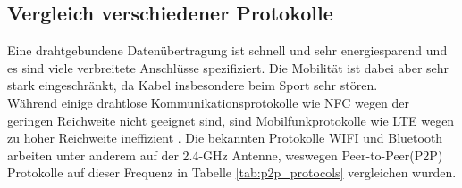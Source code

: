 \subsection{Vergleich verschiedener Protokolle}
Eine drahtgebundene Datenübertragung ist schnell und sehr energiesparend und es sind viele verbreitete Anschlüsse spezifiziert.
Die Mobilität ist dabei aber sehr stark eingeschränkt, da Kabel insbesondere beim Sport sehr stören.\\
Während einige drahtlose Kommunikationsprotokolle wie NFC wegen der geringen Reichweite nicht geeignet sind, sind Mobilfunkprotokolle wie LTE wegen zu hoher Reichweite ineffizient \cite{comparison_wifi_lte}.
Die bekannten Protokolle WIFI und Bluetooth arbeiten unter anderem auf der 2.4-GHz Antenne, weswegen Peer-to-Peer(P2P) Protokolle auf dieser Frequenz in Tabelle \ref{tab:p2p_protocols} vergleichen wurden.
